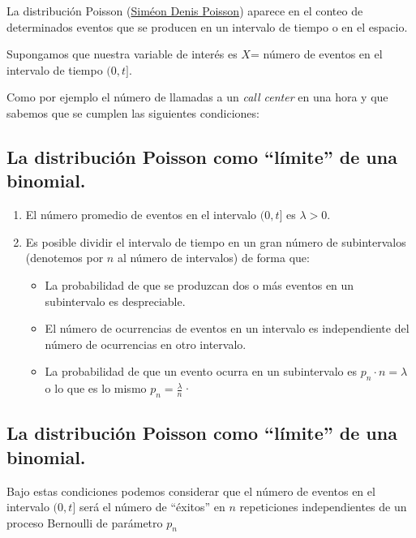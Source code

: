 \documentclass[]{book}
\providecommand{\tightlist}{%
  \setlength{\itemsep}{0pt}\setlength{\parskip}{0pt}}
\begin{document}
La distribución Poisson (\href{https://es.wikipedia.org/wiki/Sim\%C3\%A9on_Denis_Poisson}{Siméon Denis Poisson}) aparece en el conteo de determinados eventos que se producen en un intervalo de tiempo o en el espacio.

Supongamos que nuestra variable de interés es \(X\)= número de eventos en el intervalo de tiempo \((0,t]\).

Como por ejemplo el número de llamadas a un \emph{call center} en una hora y que sabemos que se cumplen las siguientes condiciones:

\hypertarget{la-distribuciuxf3n-poisson-como-luxedmite-de-una-binomial.-1}{%
\subsection{La distribución Poisson como ``límite'' de una binomial.}\label{la-distribuciuxf3n-poisson-como-luxedmite-de-una-binomial.-1}}

\begin{enumerate}
\def\labelenumi{\arabic{enumi}.}
\tightlist
\item
  El número promedio de eventos en el intervalo \((0,t]\) es
  \(\lambda>0\).
\item
  Es posible dividir el intervalo de tiempo en un
  gran número de subintervalos (denotemos por \(n\) al número de intervalos) de forma que:

  \begin{itemize}
  \tightlist
  \item
    La probabilidad de que se produzcan dos o más eventos en un subintervalo es despreciable.
  \item
    El número de ocurrencias de eventos en un intervalo es independiente del número de ocurrencias en otro intervalo.
  \item
    La probabilidad de que un evento ocurra en un subintervalo es \(p_n\cdot n=\lambda\) o lo que es lo mismo \(p_n=\frac{\lambda}{n}\)·
  \end{itemize}
\end{enumerate}

\hypertarget{la-distribuciuxf3n-poisson-como-luxedmite-de-una-binomial.-2}{%
\subsection{La distribución Poisson como ``límite'' de una binomial.}\label{la-distribuciuxf3n-poisson-como-luxedmite-de-una-binomial.-2}}

Bajo estas condiciones podemos considerar que el número de eventos en el intervalo \((0,t]\) será el número de ``éxitos'' en \(n\) repeticiones independientes de un proceso Bernoulli de parámetro \(p_n\)
\end{document}
